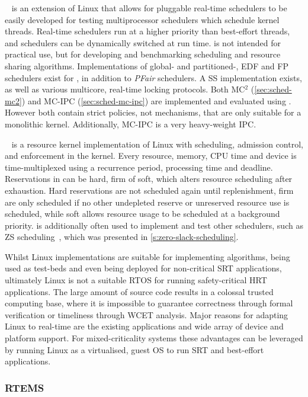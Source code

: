 \litmus~\citep{Calandrino_LBDA_06} is an extension of Linux that allows for pluggable real-time
schedulers to be easily developed for testing multiprocessor schedulers which schedule kernel
threads. Real-time schedulers run at a higher priority than best-effort threads, and schedulers can
be dynamically switched at run time. \litmus is not intended for
practical use, but for developing and benchmarking scheduling and resource sharing algorithms.
Implementations of global- and partitioned-, EDF and FP schedulers exist for \litmus, in addition to
\emph{PFair} schedulers. A \gls{SS} implementation exists, as well as various multicore,
real-time locking protocols.
Both MC$^2$ (\cref{sec:sched-mc2}) and MC-IPC (\cref{sec:sched-mc-ipc}) are implemented
and evaluated using \litmus. However both contain strict policies, not mechanisms, that are only
suitable for a monolithic kernel. Additionally, MC-IPC is a very heavy-weight \gls{IPC}. 

\linuxrk~\citep{Oikawa_Rajkumar_98} is a resource kernel implementation of Linux with scheduling,
admission control, and enforcement in the kernel. Every resource, memory, CPU time and device is 
time-multiplexed using a recurrence period, processing time and deadline. Reservations in \linuxrk
can be hard, firm of soft, which alters resource scheduling after exhaustion. Hard
reservations are not scheduled again until replenishment, firm are only scheduled if no other
undepleted reserve or unreserved resource use is scheduled, while soft allows resource usage to be
scheduled at a background priority. \linuxrk is additionally often used to implement and test other
schedulers, such as \Gls{ZS} scheduling~\citep{deNiz_LR_09}, which was presented in
\cref{s:zero-slack-scheduling}.
 
Whilst Linux implementations are suitable for implementing algorithms, being used as test-beds and
even being deployed for non-critical \gls{SRT} applications, ultimately Linux is not a suitable
\gls{RTOS} for running safety-critical \gls{HRT} applications. The large amount of source code
results in a colossal trusted computing base, where it is impossible to guarantee correctness through
formal verification or timeliness through {\gls{WCET}} analysis.  Major reasons for adapting Linux
to real-time are the existing applications and wide array of device and platform support. For
mixed-criticality systems these advantages can be leveraged by running Linux as a virtualised, guest \gls{OS} to run \gls{SRT}
and best-effort applications.

\subsubsection{RTEMS}

